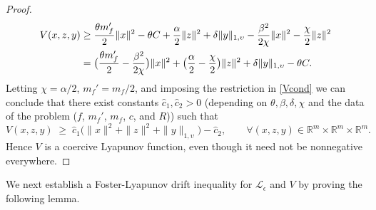 \documentclass[11pt, a4paper,leqno]{amsart}
\theoremstyle{definition}
\numberwithin{equation}{section}
\newcommand{\R}{\mathbb R}
\begin{document}
\begin{proof}
\begin{align*}
V(x,z,y)&\geq \frac{\theta m_f'}{2}\|x\|^2 - \theta C+\frac \alpha 2\|z\|^2+\delta \|y\|_{1,\upsilon}-\frac{\beta^2}{2\chi}\|x\|^2 - \frac{\chi}{2}\|z\|^2\notag\\
&=\bigl (\frac{\theta m_f'}{2}-\frac{\beta^2}{2\chi}\bigr )\|x\|^2 +\bigl (\frac \alpha 2-\frac{\chi}{2}\bigr )\|z\|^2+\delta \|y\|_{1,\upsilon} - \theta C.
\end{align*}
Letting $\chi=\alpha/2$, $m_f'=m_f/2$, and imposing the restriction in \eqref{Vcond} we can conclude that  there exist constants $\hat c_1,\hat c_2>0$ (depending on $\theta,\beta,\delta,\chi$ and the data of the problem ($f$, $m_f'$, $m_f$, $c$, and $R$)) such that
\begin{equation*}
V(x,z,y)\;\ge\; \hat c_1\bigl(\|x\|^2+\|z\|^2+\|y\|_{1,\upsilon}\bigr) - \hat c_2,
\qquad \forall (x,z,y)\in\R^{m}\times \R^m\times \R^m.
\end{equation*}
Hence $V$ is a coercive Lyapunov function, even though it need not be nonnegative everywhere.
\end{proof}







We next establish a Foster-Lyapunov drift inequality for $\mathcal{L}_\epsilon$ and  $V$ by proving the following lemma.
\end{document}
